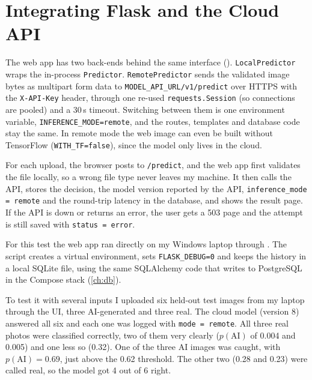 \chapter{Integrating Flask and the Cloud API}\label{ch:integration}

The web app has two back-ends behind the same interface ().
\texttt{LocalPredictor} wraps the in-process \texttt{Predictor}. \texttt{RemotePredictor} sends the
validated image bytes as multipart form data to \texttt{MODEL\_API\_URL/v1/predict} over HTTPS with
the \texttt{X-API-Key} header, through one re-used \texttt{requests.Session} (so connections are
pooled) and a 30\,s timeout. Switching between them is one environment variable,
\texttt{INFERENCE\_MODE=remote}, and the routes, templates and database code stay the same. In
remote mode the web image can even be built without TensorFlow (\texttt{WITH\_TF=false}), since the
model only lives in the cloud.

For each upload, the browser posts to \texttt{/predict}, and the web app first validates the file
locally, so a wrong file type never leaves my machine. It then calls the API, stores the decision,
the model version reported by the API, \texttt{inference\_mode = remote} and the round-trip latency
in the database, and shows the result page. If the API is down or returns an error, the user gets
a 503 page and the attempt is still saved with \texttt{status = error}.

For this test the web app ran directly on my Windows laptop through .
The script creates a virtual environment, sets \texttt{FLASK\_DEBUG=0} and keeps the history in a
local SQLite file, using the same SQLAlchemy code that writes to PostgreSQL in the Compose stack
(\cref{ch:db}).


To test it with several inputs I uploaded six held-out test images from my laptop through the UI,
three AI-generated and three real. The cloud model (version 8) answered all six and each one was
logged with \texttt{mode = remote}. All three real photos were classified correctly, two of them
very clearly ($p(\text{AI})$ of 0.004 and 0.005) and one less so (0.32). One of the three AI images
was caught, with $p(\text{AI}) = 0.69$, just above the 0.62 threshold. The other two (0.28 and
0.23) were called real, so the model got 4 out of 6 right.

